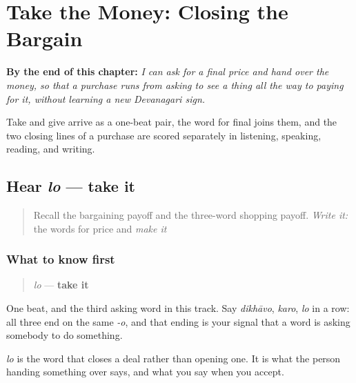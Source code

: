 
\chapter{Take the Money: Closing the Bargain}
\label{ch:mw-final-price}

\begin{chapteropening}
\textbf{By the end of this chapter:} \emph{I can ask for a final price and hand over the money, so that a purchase runs from asking to see a thing all the way to paying for it, without learning a new Devanagari sign.}

Take and give arrive as a one-beat pair, the word for final joins them, and the two closing lines of a purchase are scored separately in listening, speaking, reading, and writing.
\end{chapteropening}

\section[lo]{Hear \emph{lo} — take it}

\label{lesson:MW-C24-hear-lo}



\begin{quote}
Recall the bargaining payoff and the three-word shopping payoff. \emph{Write it:} the words for price and \emph{make it}
\end{quote}

\subsection*{What to know first}
\begin{quote}
\emph{lo} — \textbf{take it}
\end{quote}

One beat, and the third asking word in this track. Say \emph{dikhāvo}, \emph{karo}, \emph{lo} in a row: all three end on the same \emph{-o}, and that ending is your signal that a word is asking somebody to do something.

\emph{lo} is the word that closes a deal rather than opening one. It is what the person handing something over says, and what you say when you accept.

